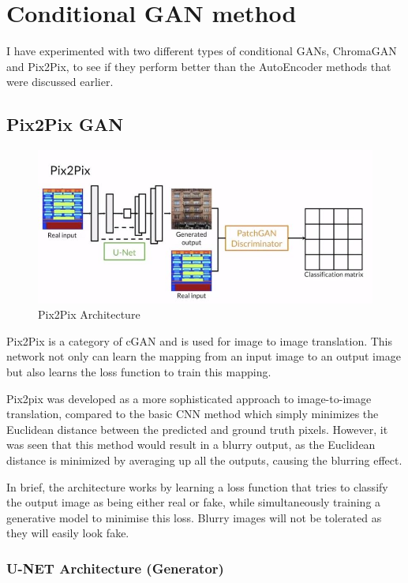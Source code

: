 \pagebreak
\section{Conditional GAN method}
I have experimented with two different types of conditional GANs, ChromaGAN and Pix2Pix, to see if they perform better than the AutoEncoder methods that were discussed earlier.

\subsection{Pix2Pix GAN}
\begin{figure}[H]
    \centering
    \includegraphics[width=1\columnwidth]{sections/figures/pix2pix_architecture.JPG}
    \caption{Pix2Pix Architecture \cite{DBLP:journals/corr/IsolaZZE16}}
    \label{fig:my_label}
\end{figure}

Pix2Pix is a category of cGAN and is used for image to image translation. This network not only can learn the mapping from an input image to an output image but also learns the loss function to train this mapping.

Pix2pix was developed as a more sophisticated approach to image-to-image translation, compared to the basic CNN method which simply minimizes the Euclidean distance between the predicted and ground truth pixels. However, it was seen that this method would result in a blurry output, as the Euclidean distance is minimized by averaging up all the outputs, causing the blurring effect.

In brief, the architecture works by learning a loss function that tries to classify the output image as being either real or fake, while simultaneously training a generative model to minimise this loss. Blurry images will not be tolerated as they will easily look fake.

\subsubsection*{U-NET Architecture (Generator)}


